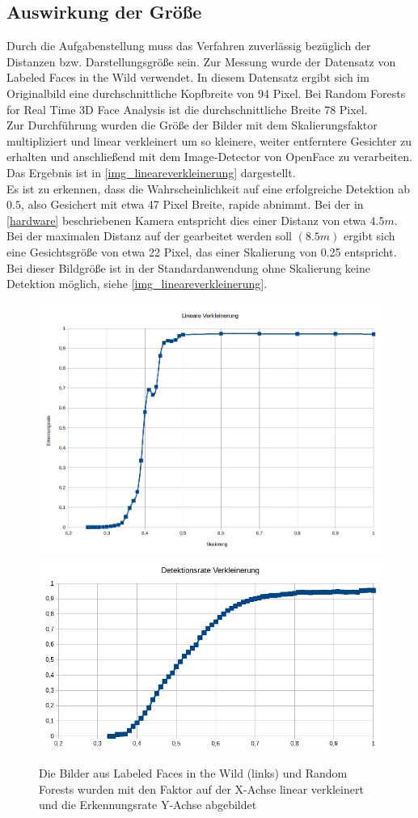 \subsection{Auswirkung der Größe}
Durch die Aufgabenstellung muss das Verfahren zuverlässig bezüglich der Distanzen bzw. Darstellungsgröße sein. Zur Messung wurde der Datensatz von Labeled Faces in the Wild \cite{database_Face} verwendet. In diesem Datensatz ergibt sich im Originalbild eine durchschnittliche Kopfbreite von 94 Pixel. Bei Random Forests for Real Time 3D Face Analysis \cite{database_Face_Ori} ist die durchschnittliche Breite 78 Pixel.\\
Zur Durchführung wurden die Größe der Bilder mit dem Skalierungsfaktor multipliziert und linear verkleinert um so kleinere, weiter entferntere Gesichter zu erhalten und anschließend mit dem Image-Detector von OpenFace zu verarbeiten. Das Ergebnis ist in \autoref{img_lineareverkleinerung} dargestellt.\\
Es ist zu erkennen, dass die Wahrscheinlichkeit auf eine erfolgreiche Detektion ab $0.5$, also Gesichert mit etwa 47 Pixel Breite, rapide abnimmt. Bei der in \autoref{hardware} beschriebenen Kamera entspricht dies einer Distanz von etwa $4.5m$.\\
Bei der maximalen Distanz auf der gearbeitet werden soll $(8.5m)$ ergibt sich eine Gesichtsgröße von etwa 22 Pixel, das einer Skalierung von 0.25 entspricht. Bei dieser Bildgröße ist in der Standardanwendung ohne Skalierung keine Detektion möglich, siehe \autoref{img_lineareverkleinerung}.
\begin{figure}
	\centering
	\includegraphics[width=0.45\linewidth]{img/lineare_Verkleinerung}
	\includegraphics[width=0.45\linewidth]{img/lineare_Verkleinerung2}
	\caption{Die Bilder aus Labeled Faces in the Wild \cite{database_Face} (links) und Random Forests \cite{database_Face_Ori} wurden mit den Faktor auf der X-Achse linear verkleinert und die Erkennungsrate Y-Achse abgebildet}
	\label{img_lineareverkleinerung}
\end{figure}
